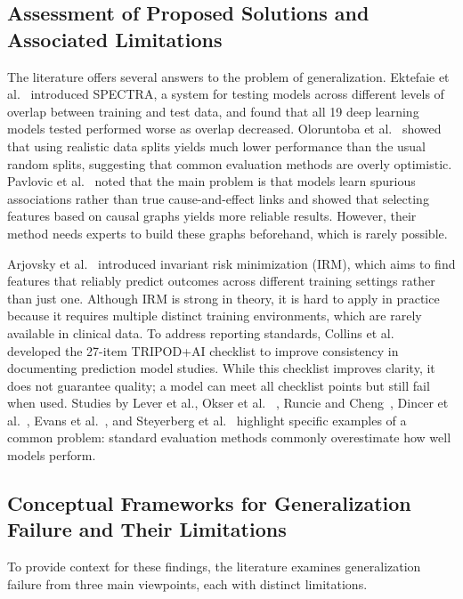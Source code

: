 \subsection{Assessment of Proposed Solutions and Associated Limitations}

The literature offers several answers to the problem of generalization. Ektefaie et al.~\cite{ektefaie2024spectra} introduced SPECTRA, a system for testing models across different levels of overlap between training and test data, and found that all 19 deep learning models tested performed worse as overlap decreased. Oloruntoba et al.~\cite{oloruntoba2023ood} showed that using realistic data splits yields much lower performance than the usual random splits, suggesting that common evaluation methods are overly optimistic. Pavlovic et al.~\cite{pavlovic2024causal} noted that the main problem is that models learn spurious associations rather than true cause-and-effect links and showed that selecting features based on causal graphs yields more reliable results. However, their method needs experts to build these graphs beforehand, which is rarely possible.

Arjovsky et al.~\cite{arjovsky2020irm} introduced invariant risk minimization (IRM), which aims to find features that reliably predict outcomes across different training settings rather than just one. Although IRM is strong in theory, it is hard to apply in practice because it requires multiple distinct training environments, which are rarely available in clinical data. To address reporting standards, Collins et al.~\cite{collins2024tripod} developed the 27-item TRIPOD+AI checklist to improve consistency in documenting prediction model studies. While this checklist improves clarity, it does not guarantee quality; a model can meet all checklist points but still fail when used. Studies by Lever et al.\cite{lever2016model}, Okser et al. ~\cite{okser2014regularized}, Runcie and Cheng~\cite{runcie2019pitfalls}, Dincer et al.~\cite{dincer2022generative}, Evans et al.~\cite{evans2020art}, and Steyerberg et al.~\cite{lever2016model} highlight specific examples of a common problem: standard evaluation methods commonly overestimate how well models perform.

\subsection{Conceptual Frameworks for Generalization Failure and Their Limitations}

To provide context for these findings, the literature examines generalization failure from three main viewpoints, each with distinct limitations.

